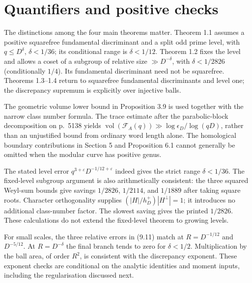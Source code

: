 \documentclass[10pt]{article}
\begin{document}
\section*{Quantifiers and positive checks}
The distinctions among the four main theorems matter. Theorem 1.1 assumes a positive squarefree fundamental discriminant and a split odd prime level, with \(q\le D^\delta\), \(\delta<1/36\); its conditional range is \(\delta<1/12\). Theorem 1.2 fixes the level and allows a coset of a subgroup of relative size \(\gg D^{-\delta}\), with \(\delta<1/2826\) (conditionally \(1/4\)). Its fundamental discriminant need not be squarefree. Theorems 1.3–1.4 return to squarefree fundamental discriminants and level one; the discrepancy supremum is explicitly over injective balls.\par
The geometric volume lower bound in Proposition 3.9 is used together with the narrow class number formula. The trace estimate after the parabolic-block decomposition on p. 5138 yields \(\operatorname{vol}(\mathcal F_A(q))\gg\log\epsilon_D/\log(qD)\), rather than an unjustified bound from ordinary word length alone. The homological boundary contributions in Section 5 and Proposition 6.1 cannot generally be omitted when the modular curve has positive genus.\par
The stated level error \(q^{3+\varepsilon}D^{-1/12+\varepsilon}\) indeed gives the strict range \(\delta<1/36\). The fixed-level subgroup argument is also arithmetically consistent: the three squared Weyl-sum bounds give savings \(1/2826\), \(1/2114\), and \(1/1889\) after taking square roots. Character orthogonality supplies \((|H|/h_D^+)|H^\perp|=1\); it introduces no additional class-number factor. The slowest saving gives the printed \(1/2826\). These calculations do not extend the fixed-level theorem to growing levels.\par
For small scales, the three relative errors in (9.11) match at \(R=D^{-1/12}\) and \(D^{-5/12}\). At \(R=D^{-\delta}\) the final branch tends to zero for \(\delta<1/2\). Multiplication by the ball area, of order \(R^2\), is consistent with the discrepancy exponent. These exponent checks are conditional on the analytic identities and moment inputs, including the regularisation discussed next.\par
\end{document}
